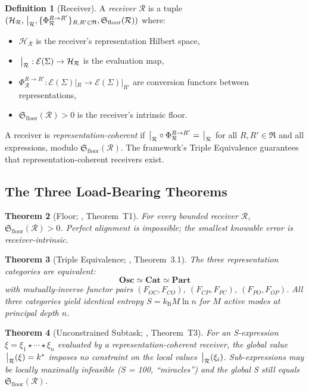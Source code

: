 \documentclass[11pt,twocolumn,a4paper]{article}
\newtheorem{theorem}{Theorem}[section]
\theoremstyle{definition}
\newtheorem{definition}[theorem]{Definition}
\theoremstyle{remark}
\newcommand{\kB}{k_{\mathrm{B}}}
\newcommand{\Hilbert}{\mathcal{H}}
\newcommand{\Recv}{\mathcal{R}}
\newcommand{\Floor}{{\mathfrak{S}_{\mathrm{floor}}}}
\newcommand{\Reps}{\mathfrak{R}}
\newcommand{\Sexp}{\xi}
\begin{document}
\begin{definition}[Receiver]
\label{def:receiver}
A \emph{receiver} $\Recv$ is a tuple $(\Hilbert_\Recv, \eval_\Recv, \{\Phi_\Recv^{R \to R'}\}_{R, R' \in \Reps}, \Floor(\Recv))$ where:
\begin{itemize}[nosep]
    \item $\Hilbert_\Recv$ is the receiver's representation Hilbert space,
    \item $\eval_\Recv: \mathcal{E}(\Sigma) \to \Hilbert_\Recv$ is the evaluation map,
    \item $\Phi_\Recv^{R \to R'}: \mathcal{E}(\Sigma)|_R \to \mathcal{E}(\Sigma)|_{R'}$ are conversion functors between representations,
    \item $\Floor(\Recv) > 0$ is the receiver's intrinsic floor.
\end{itemize}
\end{definition}

A receiver is \emph{representation-coherent} if $\eval_\Recv \circ \Phi_\Recv^{R \to R'} = \eval_\Recv$ for all $R, R' \in \Reps$ and all expressions, modulo $\Floor(\Recv)$. The framework's Triple Equivalence \citep{sachikonye2025_partition} guarantees that representation-coherent receivers exist.

\subsection{The Three Load-Bearing Theorems}

\begin{theorem}[Floor; \citealt{sachikonye2025unc}, Theorem~T1]
\label{thm:floor_unc}
For every bounded receiver $\Recv$, $\Floor(\Recv) > 0$. Perfect alignment is impossible; the smallest knowable error is receiver-intrinsic.
\end{theorem}

\begin{theorem}[Triple Equivalence; \citealt{sachikonye2025_partition}, Theorem~3.1]
\label{thm:triple_eq}
The three representation categories are equivalent:
\begin{equation}
\mathbf{Osc} \simeq \mathbf{Cat} \simeq \mathbf{Part}
\end{equation}
with mutually-inverse functor pairs $(F_{OC}, F_{CO})$, $(F_{CP}, F_{PC})$, $(F_{PO}, F_{OP})$. All three categories yield identical entropy $S = \kB M \ln n$ for $M$ active modes at principal depth $n$.
\end{theorem}

\begin{theorem}[Unconstrained Subtask; \citealt{sachikonye2025unc}, Theorem~T3]
\label{thm:unconstrained}
For an S-expression $\Sexp = \Sexp_1 \star \cdots \star \Sexp_n$ evaluated by a representation-coherent receiver, the global value $\eval_\Recv(\Sexp) = k^*$ imposes no constraint on the local values $\eval_\Recv(\Sexp_i)$. Sub-expressions may be locally maximally infeasible (S = 100, ``miracles'') and the global S still equals $\Floor(\Recv)$.
\end{theorem}
\end{document}

